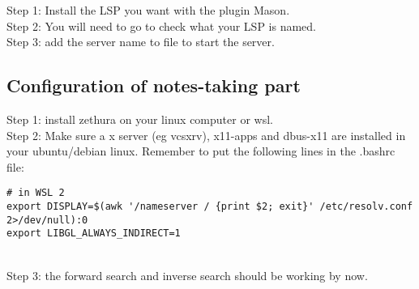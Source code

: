 \documentclass{article}
\begin{document}
Step 1: Install the LSP you want with the plugin Mason.\newline\\
Step 2: You will need to go  to check what your LSP is named. \newline\\
Step 3: add the server name to file  to start the server.

\subsection{Configuration of notes-taking part}

Step 1: install zethura on your linux computer or wsl. \newline\\ 
Step 2: Make sure a x server (eg vcsxrv), x11-apps and dbus-x11 are installed in your ubuntu/debian linux. Remember to put the following lines in the .bashrc file:
\begin{verbatim}
# in WSL 2
export DISPLAY=$(awk '/nameserver / {print $2; exit}' /etc/resolv.conf 2>/dev/null):0 
export LIBGL_ALWAYS_INDIRECT=1
\end{verbatim}
\newline\\
Step 3: the forward search and inverse search should be working by now. 
\end{document}
